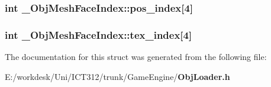 \subsubsection[{pos\+\_\+index}]{\setlength{\rightskip}{0pt plus 5cm}int \+\_\+\+Obj\+Mesh\+Face\+Index\+::pos\+\_\+index[4]}\label{struct___obj_mesh_face_index_aaabace422c67177dc0cde23a00ac430f}
\subsubsection[{tex\+\_\+index}]{\setlength{\rightskip}{0pt plus 5cm}int \+\_\+\+Obj\+Mesh\+Face\+Index\+::tex\+\_\+index[4]}\label{struct___obj_mesh_face_index_a112beb350014f71b527297a0179e0a26}


The documentation for this struct was generated from the following file\+:\begin{DoxyCompactItemize}
\item 
E\+:/workdesk/\+Uni/\+I\+C\+T312/trunk/\+Game\+Engine/{\bf Obj\+Loader.\+h}\end{DoxyCompactItemize}

